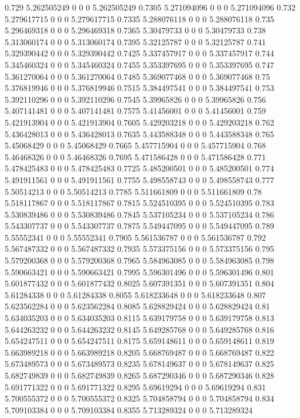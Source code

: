 {0.729 5.262505249 0 0 0 5.262505249
0.7305 5.271094096 0 0 0 5.271094096
0.732 5.279617715 0 0 0 5.279617715
0.7335 5.288076118 0 0 0 5.288076118
0.735 5.296469318 0 0 0 5.296469318
0.7365 5.30479733 0 0 0 5.30479733
0.738 5.313060174 0 0 0 5.313060174
0.7395 5.32125787 0 0 0 5.32125787
0.741 5.329390442 0 0 0 5.329390442
0.7425 5.337457917 0 0 0 5.337457917
0.744 5.345460324 0 0 0 5.345460324
0.7455 5.353397695 0 0 0 5.353397695
0.747 5.361270064 0 0 0 5.361270064
0.7485 5.369077468 0 0 0 5.369077468
0.75 5.376819946 0 0 0 5.376819946
0.7515 5.384497541 0 0 0 5.384497541
0.753 5.392110296 0 0 0 5.392110296
0.7545 5.39965826 0 0 0 5.39965826
0.756 5.407141481 0 0 0 5.407141481
0.7575 5.41456001 0 0 0 5.41456001
0.759 5.421913904 0 0 0 5.421913904
0.7605 5.429203218 0 0 0 5.429203218
0.762 5.436428013 0 0 0 5.436428013
0.7635 5.443588348 0 0 0 5.443588348
0.765 5.45068429 0 0 0 5.45068429
0.7665 5.457715904 0 0 0 5.457715904
0.768 5.46468326 0 0 0 5.46468326
0.7695 5.471586428 0 0 0 5.471586428
0.771 5.478425483 0 0 0 5.478425483
0.7725 5.485200501 0 0 0 5.485200501
0.774 5.491911561 0 0 0 5.491911561
0.7755 5.498558743 0 0 0 5.498558743
0.777 5.50514213 0 0 0 5.50514213
0.7785 5.511661809 0 0 0 5.511661809
0.78 5.518117867 0 0 0 5.518117867
0.7815 5.524510395 0 0 0 5.524510395
0.783 5.530839486 0 0 0 5.530839486
0.7845 5.537105234 0 0 0 5.537105234
0.786 5.543307737 0 0 0 5.543307737
0.7875 5.549447095 0 0 0 5.549447095
0.789 5.55552341 0 0 0 5.55552341
0.7905 5.561536787 0 0 0 5.561536787
0.792 5.567487332 0 0 0 5.567487332
0.7935 5.573375156 0 0 0 5.573375156
0.795 5.579200368 0 0 0 5.579200368
0.7965 5.584963085 0 0 0 5.584963085
0.798 5.590663421 0 0 0 5.590663421
0.7995 5.596301496 0 0 0 5.596301496
0.801 5.601877432 0 0 0 5.601877432
0.8025 5.607391351 0 0 0 5.607391351
0.804 5.61284338 0 0 0 5.61284338
0.8055 5.618233648 0 0 0 5.618233648
0.807 5.623562284 0 0 0 5.623562284
0.8085 5.628829424 0 0 0 5.628829424
0.81 5.634035203 0 0 0 5.634035203
0.8115 5.639179758 0 0 0 5.639179758
0.813 5.644263232 0 0 0 5.644263232
0.8145 5.649285768 0 0 0 5.649285768
0.816 5.654247511 0 0 0 5.654247511
0.8175 5.659148611 0 0 0 5.659148611
0.819 5.663989218 0 0 0 5.663989218
0.8205 5.668769487 0 0 0 5.668769487
0.822 5.673489573 0 0 0 5.673489573
0.8235 5.678149637 0 0 0 5.678149637
0.825 5.682749839 0 0 0 5.682749839
0.8265 5.687290346 0 0 0 5.687290346
0.828 5.691771322 0 0 0 5.691771322
0.8295 5.69619294 0 0 0 5.69619294
0.831 5.700555372 0 0 0 5.700555372
0.8325 5.704858794 0 0 0 5.704858794
0.834 5.709103384 0 0 0 5.709103384
0.8355 5.713289324 0 0 0 5.713289324
}
